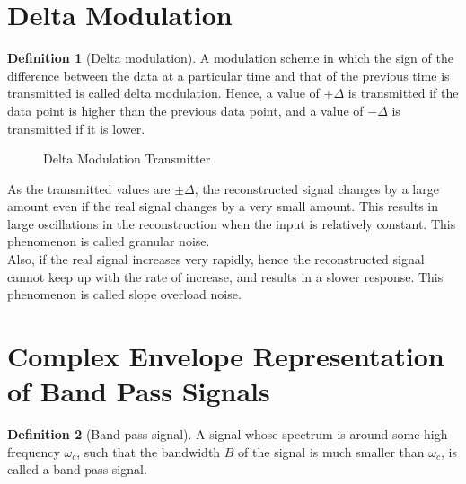 \documentclass[titlepage, fleqn, a4paper, 12pt, twoside]{article}
\theoremstyle{definition}
\newtheorem{definition}{Definition}
\theoremstyle{theorem}
\begin{document}
\section{Delta Modulation}

\begin{definition}[Delta modulation]
	A modulation scheme in which the sign of the difference between the data at a particular time and that of the previous time is transmitted is called delta modulation.
	Hence, a value of $+\Delta$ is transmitted if the data point is higher than the previous data point, and a value of $-\Delta$ is transmitted if it is lower.
\end{definition}

\begin{figure}[H]
	\centering
	\caption{Delta Modulation Transmitter}
	\label{fig:delta_modulation_transmitter}
\end{figure}

As the transmitted values are $\pm \Delta$, the reconstructed signal changes by a large amount even if the real signal changes by a very small amount.
This results in large oscillations in the reconstruction when the input is relatively constant.
This phenomenon is called granular noise.\\
Also, if the real signal increases very rapidly, hence the reconstructed signal cannot keep up with the rate of increase, and results in a slower response.
This phenomenon is called slope overload noise.

\section{Complex Envelope Representation of Band Pass Signals}

\begin{definition}[Band pass signal]
	A signal whose spectrum is around some high frequency $\omega_c$, such that the bandwidth $B$ of the signal is much smaller than $\omega_c$, is called a band pass signal.
\end{definition}
\end{document}
